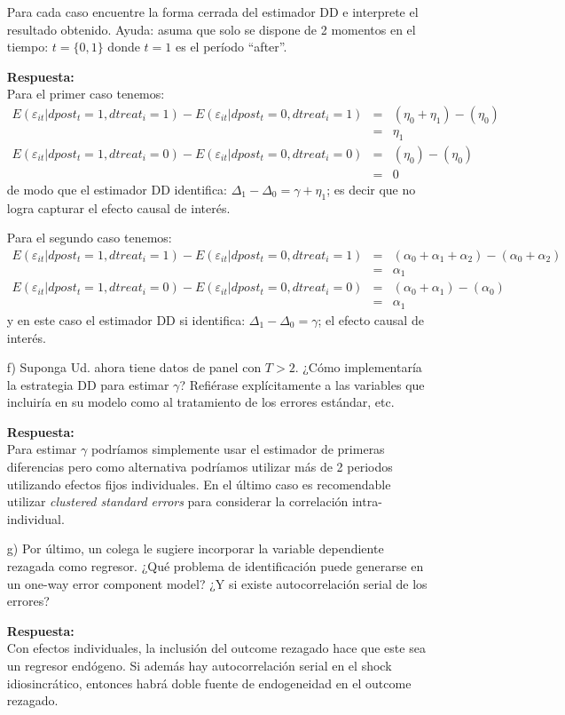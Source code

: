 \documentclass[11pt]{article}
\begin{document}
\begin{enumerate}
Para cada caso encuentre la forma cerrada del estimador DD e interprete el resultado obtenido. Ayuda: asuma que solo se dispone de 2 momentos en el tiempo: $t=\{0,1\}$ donde $t=1$ es el período ``after''. 

\textbf{Respuesta:}\\
Para el primer caso tenemos:
\begin{eqnarray*}
E(\varepsilon_{it} |dpost_t=1,dtreat_i=1)-E(\varepsilon_{it} |dpost_t=0,dtreat_i=1) &=& (\eta_0+\eta_1)-(\eta_0)\\
&=& \eta_1 \\
E(\varepsilon_{it} |dpost_t=1,dtreat_i=0)-E(\varepsilon_{it} |dpost_t=0,dtreat_i=0) &=& (\eta_0)-(\eta_0)\\
&=& 0 
\end{eqnarray*}
de modo que el estimador DD identifica: $\Delta_1-\Delta_0=\gamma+\eta_1$; es decir que no logra capturar el efecto causal de interés.

Para el segundo caso tenemos:
\begin{eqnarray*}
E(\varepsilon_{it} |dpost_t=1,dtreat_i=1)-E(\varepsilon_{it} |dpost_t=0,dtreat_i=1) &=& (\alpha_0+\alpha_1+\alpha_2)-(\alpha_0+\alpha_2)\\
&=& \alpha_1 \\
E(\varepsilon_{it} |dpost_t=1,dtreat_i=0)-E(\varepsilon_{it} |dpost_t=0,dtreat_i=0) &=& (\alpha_0+\alpha_1)-(\alpha_0)\\
&=& \alpha_1
\end{eqnarray*}
y en este caso el estimador DD si identifica: $\Delta_1-\Delta_0=\gamma$; el efecto causal de interés.

\item[f)] Suponga Ud. ahora tiene datos de panel con $T>2$. ¿Cómo implementaría la estrategia DD para estimar $\gamma$? Refiérase explícitamente a las variables que incluiría en su modelo como al tratamiento de los errores estándar, etc.

\textbf{Respuesta:}\\
Para estimar $\gamma$ podríamos simplemente usar el estimador de primeras diferencias pero como alternativa podríamos utilizar más de 2 periodos utilizando efectos fijos individuales. En el último caso es recomendable utilizar \textit{clustered standard errors} para considerar la correlación intra-individual. 

\item[g)] Por último, un colega le sugiere incorporar la variable dependiente rezagada como regresor. ¿Qué problema de identificación puede generarse en un one-way error component model? ¿Y si existe autocorrelación serial de los errores?

\textbf{Respuesta:}\\
Con efectos individuales, la inclusión del outcome rezagado hace que este sea un regresor endógeno. Si además hay autocorrelación serial en el shock idiosincrático, entonces habrá doble fuente de endogeneidad en el outcome rezagado.
\end{enumerate}
\end{document}
